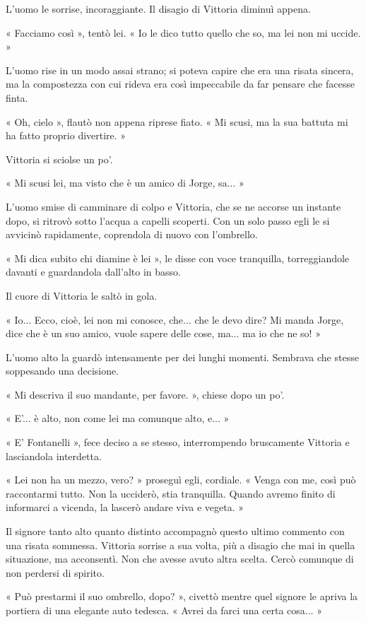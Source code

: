 L'uomo le sorrise, incoraggiante. Il disagio di Vittoria diminuì appena.

« Facciamo così », tentò lei. « Io le dico tutto quello che so, ma lei non mi uccide. »

L'uomo rise in un modo assai strano; si poteva capire che era una risata sincera, ma la compostezza con cui rideva era così impeccabile da far pensare che facesse finta.

« Oh, cielo », flautò non appena riprese fiato. « Mi scusi, ma la sua battuta mi ha fatto proprio divertire. »

Vittoria si sciolse un po'.

« Mi scusi lei, ma visto che è un amico di Jorge, sa... »

L'uomo smise di camminare di colpo e Vittoria, che se ne accorse un instante dopo, si ritrovò sotto l'acqua a capelli scoperti. Con un solo passo egli le si avvicinò rapidamente, coprendola di nuovo con l'ombrello.

« Mi dica subito chi diamine è lei », le disse con voce tranquilla, torreggiandole davanti e guardandola dall'alto in basso.

Il cuore di Vittoria le saltò in gola.

« Io... Ecco, cioè, lei non mi conosce, che... che le devo dire? Mi manda Jorge, dice che è un suo amico, vuole sapere delle cose, ma... ma io che ne so! »

L'uomo alto la guardò intensamente per dei lunghi momenti. Sembrava che stesse soppesando una decisione.

« Mi descriva il suo mandante, per favore. », chiese dopo un po'.

« E'... è alto, non come lei ma comunque alto, e... »

« E' Fontanelli », fece deciso a se stesso, interrompendo bruscamente Vittoria e lasciandola interdetta.

« Lei non ha un mezzo, vero? » proseguì egli, cordiale. « Venga con me, così può raccontarmi tutto. Non la ucciderò, stia tranquilla. Quando avremo finito di informarci a vicenda, la lascerò andare viva e vegeta. »

Il signore tanto alto quanto distinto accompagnò questo ultimo commento con una risata sommessa. Vittoria sorrise a sua volta, più a disagio che mai in quella situazione, ma acconsentì. Non che avesse avuto altra scelta. Cercò comunque di non perdersi di spirito.

« Può prestarmi il suo ombrello, dopo? », civettò mentre quel signore le apriva la portiera di una elegante auto tedesca. « Avrei da farci una certa cosa... »

